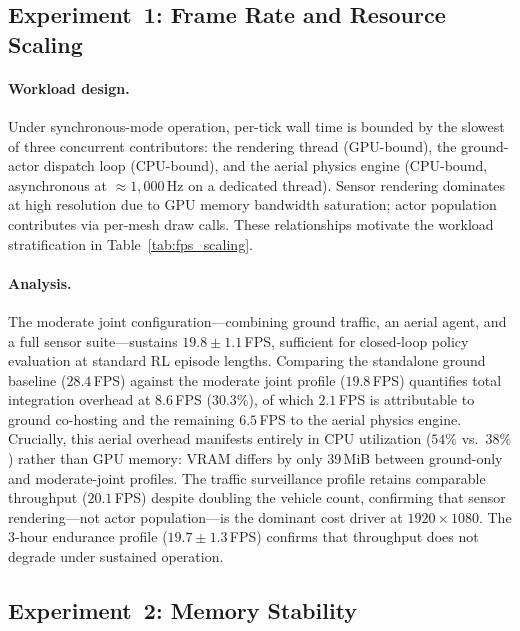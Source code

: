\subsection{Experiment~1: Frame Rate and Resource Scaling}
\label{sec:perf:fps}

\paragraph{Workload design.}
Under synchronous-mode operation, per-tick wall time is bounded by the slowest
of three concurrent contributors: the rendering thread (GPU-bound), the
ground-actor dispatch loop (CPU-bound), and the aerial physics engine
(CPU-bound, asynchronous at ${\approx}1{,}000$\,Hz on a dedicated thread).
Sensor rendering dominates at high resolution due to GPU memory bandwidth
saturation; actor population contributes via per-mesh draw calls.
These relationships motivate the workload stratification in
Table~\ref{tab:fps_scaling}.



\paragraph{Analysis.}
The moderate joint configuration---combining ground traffic, an aerial agent,
and a full sensor suite---sustains $19.8 \pm 1.1$\,FPS, sufficient for
closed-loop policy evaluation at standard RL episode lengths.
Comparing the standalone ground baseline ($28.4$\,FPS) against the moderate
joint profile ($19.8$\,FPS) quantifies total integration overhead at
$8.6$\,FPS (30.3\%), of which $2.1$\,FPS is attributable to ground co-hosting
and the remaining $6.5$\,FPS to the aerial physics engine.
Crucially, this aerial overhead manifests entirely in CPU utilization ($54\%$
vs.\ $38\%$) rather than GPU memory: VRAM differs by only 39\,MiB between
ground-only and moderate-joint profiles.
The traffic surveillance profile retains comparable throughput ($20.1$\,FPS)
despite doubling the vehicle count, confirming that sensor rendering---not
actor population---is the dominant cost driver at $1920\times1080$.
The 3-hour endurance profile ($19.7 \pm 1.3$\,FPS) confirms that throughput
does not degrade under sustained operation.

\subsection{Experiment~2: Memory Stability}
\label{sec:perf:vram}

